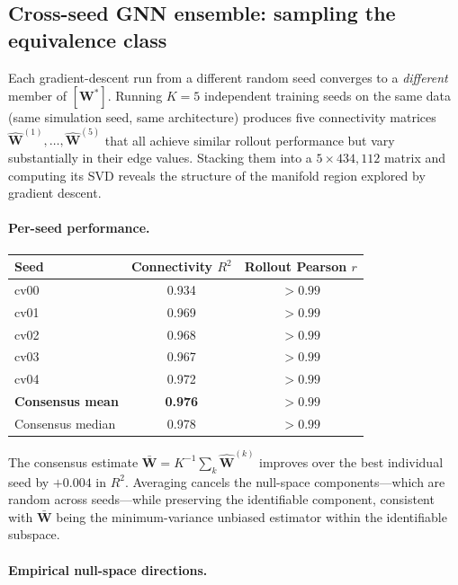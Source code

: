 \documentclass[11pt,a4paper]{article}
\begin{document}
\subsection{Cross-seed GNN ensemble: sampling the equivalence class}
\label{subsec:cv-ensemble}

Each gradient-descent run from a different random seed converges to a
\emph{different} member of $[\mathbf{W}^*]$.  Running $K=5$ independent
training seeds on the same data (same simulation seed, same architecture)
produces five connectivity matrices $\hat{\mathbf{W}}^{(1)},\ldots,
\hat{\mathbf{W}}^{(5)}$ that all achieve similar rollout performance but
vary substantially in their edge values.  Stacking them into a
$5\times 434{,}112$ matrix and computing its SVD reveals the structure of
the manifold region explored by gradient descent.

\paragraph{Per-seed performance.}

\begin{center}
\begin{tabular}{lcc}
\toprule
Seed & Connectivity $R^2$ & Rollout Pearson $r$ \\
\midrule
cv00 & 0.934 & $>0.99$ \\
cv01 & 0.969 & $>0.99$ \\
cv02 & 0.968 & $>0.99$ \\
cv03 & 0.967 & $>0.99$ \\
cv04 & 0.972 & $>0.99$ \\
\midrule
\textbf{Consensus mean} & \textbf{0.976} & $>0.99$ \\
Consensus median & 0.978 & $>0.99$ \\
\bottomrule
\end{tabular}
\end{center}

The consensus estimate $\bar{\mathbf{W}} = K^{-1}\sum_k \hat{\mathbf{W}}^{(k)}$
improves over the best individual seed by $+0.004$ in $R^2$.  Averaging
cancels the null-space components---which are random across seeds---while
preserving the identifiable component, consistent with $\bar{\mathbf{W}}$
being the minimum-variance unbiased estimator within the identifiable subspace.

\paragraph{Empirical null-space directions.}
\end{document}
